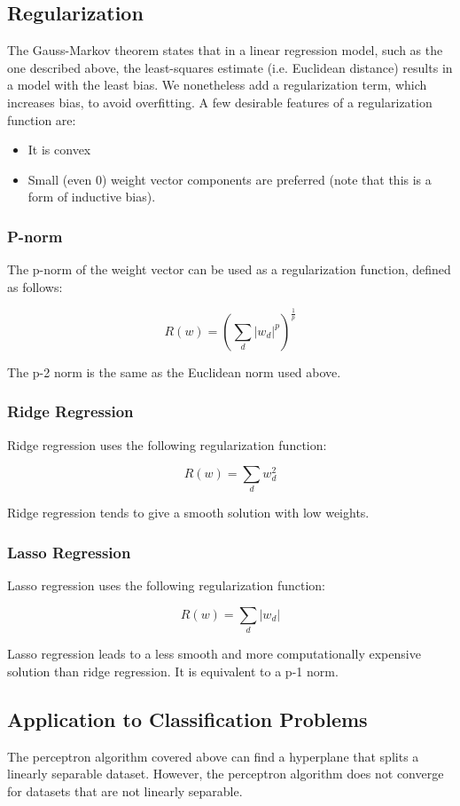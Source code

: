 \documentclass[12pt,titlepage]{article}
\begin{document}
    \subsection{Regularization}
      The Gauss-Markov theorem states that in a linear regression model, such as the one described above, the least-squares estimate (i.e. Euclidean distance) results in
      a model with the least bias. We nonetheless add a regularization term, which increases bias, to avoid overfitting. A few desirable features of a regularization function
      are:
      \begin{itemize}
        \item It is convex
        \item Small (even 0) weight vector components are preferred (note that this is a form of inductive bias).
      \end{itemize}

      \subsubsection{P-norm}
        The p-norm of the weight vector can be used as a regularization function, defined as follows:

        $$R(w) = (\sum_d |w_d|^p)^\frac{1}{p}$$

        The p-2 norm is the same as the Euclidean norm used above.

      \subsubsection{Ridge Regression}
        Ridge regression uses the following regularization function:

        $$R(w) = \sum_d w_d^2 $$

        Ridge regression tends to give a smooth solution with low weights.

      \subsubsection{Lasso Regression}
        Lasso regression uses the following regularization function:

        $$R(w) = \sum_d |w_d| $$

        Lasso regression leads to a less smooth and more computationally expensive solution than ridge regression. It is equivalent to a p-1 norm.

    \subsection{Application to Classification Problems}
      The perceptron algorithm covered above can find a hyperplane that splits a linearly separable dataset. However, the perceptron algorithm does not converge for datasets
      that are not linearly separable.
\end{document}
